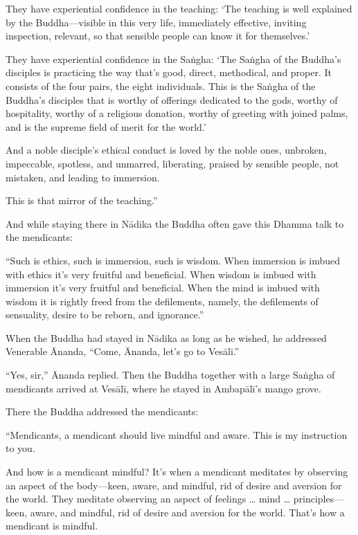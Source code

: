 \documentclass[12pt,openany]{book}%
\begin{document}
They have experiential confidence in the teaching: ‘The teaching is well explained by the Buddha—visible in this very life, immediately effective, inviting inspection, relevant, so that sensible people can know it for themselves.’ 

They have experiential confidence in the \textsanskrit{Saṅgha}: ‘The \textsanskrit{Saṅgha} of the Buddha’s disciples is practicing the way that’s good, direct, methodical, and proper. It consists of the four pairs, the eight individuals. This is the \textsanskrit{Saṅgha} of the Buddha’s disciples that is worthy of offerings dedicated to the gods, worthy of hospitality, worthy of a religious donation, worthy of greeting with joined palms, and is the supreme field of merit for the world.’ 

And a noble disciple’s ethical conduct is loved by the noble ones, unbroken, impeccable, spotless, and unmarred, liberating, praised by sensible people, not mistaken, and leading to immersion. 

This is that mirror of the teaching.” 

And while staying there in \textsanskrit{Nādika} the Buddha often gave this Dhamma talk to the mendicants: 

“Such is ethics, such is immersion, such is wisdom. When immersion is imbued with ethics it’s very fruitful and beneficial. When wisdom is imbued with immersion it’s very fruitful and beneficial. When the mind is imbued with wisdom it is rightly freed from the defilements, namely, the defilements of sensuality, desire to be reborn, and ignorance.” 

When the Buddha had stayed in \textsanskrit{Nādika} as long as he wished, he addressed Venerable Ānanda, “Come, Ānanda, let’s go to \textsanskrit{Vesālī}.” 

“Yes, sir,” Ānanda replied. Then the Buddha together with a large \textsanskrit{Saṅgha} of mendicants arrived at \textsanskrit{Vesālī}, where he stayed in \textsanskrit{Ambapālī}’s mango grove. 

There the Buddha addressed the mendicants: 

“Mendicants, a mendicant should live mindful and aware. This is my instruction to you. 

And how is a mendicant mindful? It’s when a mendicant meditates by observing an aspect of the body—keen, aware, and mindful, rid of desire and aversion for the world. They meditate observing an aspect of feelings … mind … principles—keen, aware, and mindful, rid of desire and aversion for the world. That’s how a mendicant is mindful. 
\end{document}
